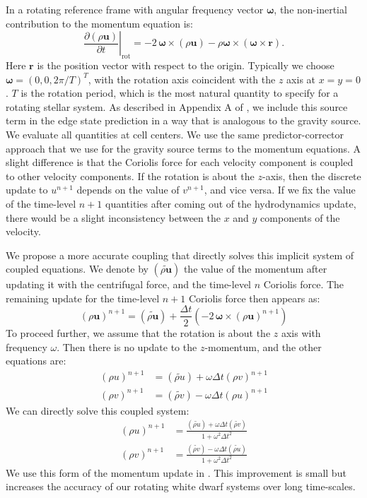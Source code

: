 \documentclass[12pt]{article}
\begin{document}
In a rotating reference frame with angular frequency vector $\bm{\omega}$,
the non-inertial contribution to the momentum equation is:
\begin{equation}
  \left.\frac{\partial(\rho \mathbf{u})}{\partial t}\right|_{\text{rot}} = -2\, {\bm\omega} \times (\rho\mathbf{u}) - \rho {\bm\omega} \times \left({\bm\omega} \times \mathbf{r}\right).
\end{equation}
Here $\mathbf{r}$ is the position vector with respect to the origin. Typically we choose $\bm{\omega} = (0, 0, 2\pi / T)^T$,
with the rotation axis coincident with the $z$ axis at $x = y = 0$.
$T$ is the rotation period, which is the most natural quantity to specify
for a rotating stellar system. As described in Appendix A of \cite{wdmergerI}, we include this source term
in the edge state prediction in a way that is analogous to the gravity source.
We evaluate all quantities at cell centers. We use the same predictor-corrector 
approach that we use for the gravity source terms to the momentum equations. A slight 
difference is that the Coriolis force for each velocity component is coupled to other velocity 
components. If the rotation is about the $z$-axis, then the discrete update to 
$u^{n+1}$ depends on the value of $v^{n+1}$, and vice versa. If we fix the value of 
the time-level $n+1$ quantities after coming out of the hydrodynamics update, there 
would be a slight inconsistency between the $x$ and $y$ components of the velocity. 

We propose a more accurate coupling that directly solves this implicit system of coupled 
equations. We denote by $(\widetilde{\rho \mathbf{u}})$ the value of the momentum after 
updating it with the centrifugal force, and the time-level $n$ Coriolis force. The remaining 
update for the time-level $n+1$ Coriolis force then appears as:
\begin{equation}
  (\rho \mathbf{u})^{n+1} = (\widetilde{\rho\mathbf{u}}) + \frac{\Delta t}{2} \left(-2\, {\bm\omega} \times (\rho\mathbf{u})^{n+1}\right)
\end{equation}
To proceed further, we assume that the rotation is about the $z$ axis with frequency $\omega$. 
Then there is no update to the $z$-momentum, and the other equations are:
\begin{align}
  (\rho u)^{n+1} &= (\widetilde{\rho u}) + \omega \Delta t (\rho v)^{n+1} \\
  (\rho v)^{n+1} &= (\widetilde{\rho v}) - \omega \Delta t (\rho u)^{n+1}
\end{align} 
We can directly solve this coupled system:
\begin{align}
  (\rho u)^{n+1} &= \frac{ (\widetilde{\rho u}) + \omega \Delta t (\widetilde{\rho v})}{1 + \omega^2 \Delta t^2} \\
  (\rho v)^{n+1} &= \frac{ (\widetilde{\rho v}) - \omega \Delta t (\widetilde{\rho u})}{1 + \omega^2 \Delta t^2}
\end{align}
We use this form of the momentum update in \castro. This improvement is small
but increases the accuracy of our rotating white dwarf systems over long time-scales.
\end{document}
